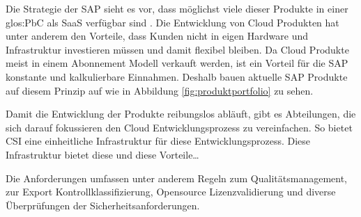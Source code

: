 \documentclass[../main.tex]{subfiles}
\begin{document}
Die Strategie der SAP sieht es vor, dass möglichst viele dieser Produkte in einer \gls{glos:PbC} als \gls{SaaS} verfügbar sind \cite{SAPCloudStrategy}.
Die Entwicklung von Cloud Produkten hat unter anderem den Vorteile, dass Kunden nicht in eigen Hardware und Infrastruktur investieren müssen und damit flexibel bleiben.
Da Cloud Produkte meist in einem Abonnement Modell verkauft werden, ist ein Vorteil für die SAP konstante und kalkulierbare Einnahmen.
Deshalb bauen aktuelle SAP Produkte auf diesem Prinzip auf wie in Abbildung \ref{fig:produktportfolio} zu sehen.
\cite{CloudProContra}

Damit die Entwicklung der Produkte reibungslos abläuft, gibt es Abteilungen, die sich darauf fokussieren den Cloud Entwicklungsprozess zu vereinfachen.
So bietet \gls{CSI} eine einheitliche Infrastruktur für diese Entwicklungsprozess. Diese Infrastruktur bietet diese und diese Vorteile…

Die Anforderungen umfassen unter anderem Regeln zum Qualitätsmanagement, zur Export Kontrollklassifizierung, Opensource Lizenzvalidierung und diverse Überprüfungen der Sicherheitsanforderungen.
\end{document}
